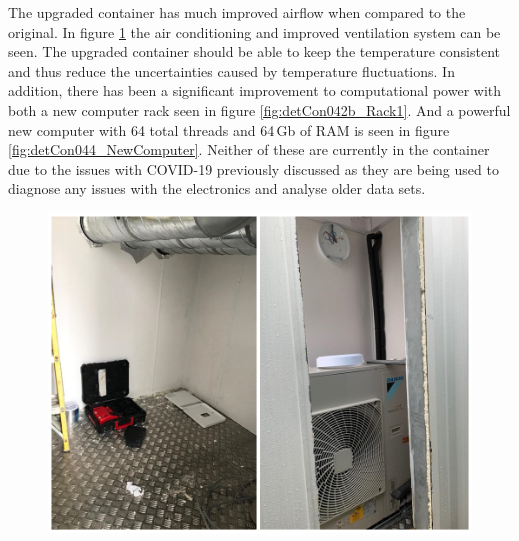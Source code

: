The upgraded container has much improved airflow when compared to the original. 
In figure  \ref{fig:detCon035b_ContainerAirCon} the air conditioning and improved ventilation system can be seen. The upgraded container should be able to keep the temperature consistent and thus reduce the uncertainties caused by temperature fluctuations. In addition, there has been a significant improvement to computational power with both a new computer rack seen in figure \ref{fig:detCon042b_Rack1}. And a powerful new computer with 64 total threads and 64\,Gb of RAM is seen in figure \ref{fig:detCon044_NewComputer}. Neither of these are currently in the container due to the issues with COVID-19 previously discussed as they are being used to diagnose any issues with the electronics and analyse older data sets.  

\begin{figure}[!h]
\centering
\includegraphics[width=0.7\linewidth]{Chapter3/Figs/Raster/detCon035b_ContainerAirCon.png}
\label{fig:detCon035b_ContainerAirCon}
\end{figure}



